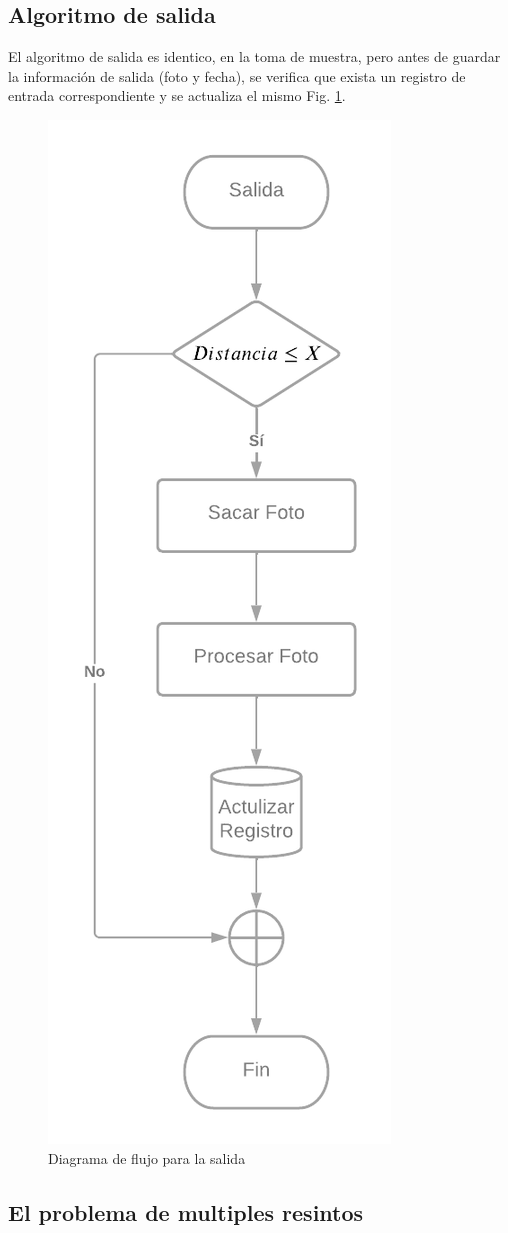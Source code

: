 \subsection{Algoritmo de salida}

El algoritmo de salida es identico, en la toma de muestra, pero antes de guardar la información de salida (foto y fecha), se verifica que exista un registro de entrada correspondiente y se actualiza el mismo Fig. \ref{fig:flujo-salida}.

\begin{figure}
    \centering
    \includegraphics[width=.5\textwidth]{imgs/flujo-salida.png}
    \caption{Diagrama de flujo para la salida}
    \label{fig:flujo-salida}
\end{figure}

\subsection{El problema de multiples resintos}


